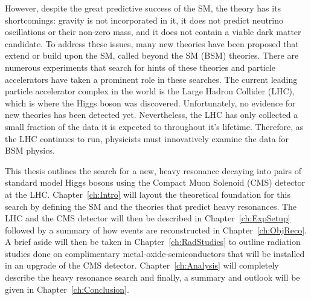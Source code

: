 However, despite the great predictive success of the SM, the theory has its shortcomings: gravity is not incorporated in it, it does not predict neutrino oscillations or their non-zero mass, and it does not contain a viable dark matter candidate. To address these issues, many new theories have been proposed that extend or build upon the SM, called beyond the SM (BSM) theories. There are numerous experiments that search for hints of these theories and particle accelerators have taken a prominent role in these searches. The current leading particle accelerator complex in the world is the Large Hadron Collider (LHC), which is where the Higgs boson was discovered. Unfortunately, no evidence for new theories has been detected yet. Nevertheless, the LHC has only collected a small fraction of the data it is expected to throughout it’s lifetime. Therefore, as the LHC continues to run, physicists must innovatively examine the data for BSM physics.

This thesis outlines the search for a new, heavy resonance decaying into pairs of standard model Higgs bosons using the Compact Muon Solenoid (CMS) detector at the LHC. Chapter~\ref{ch:Intro} will layout the theoretical foundation for this search by defining the SM and the theories that predict heavy resonances. The LHC and the CMS detector will then be described in Chapter~\ref{ch:ExpSetup} followed by a summary of how events are reconstructed in Chapter~\ref{ch:ObjReco}. A brief aside will then be taken in Chapter~\ref{ch:RadStudies} to outline radiation studies done on complimentary metal-oxide-semiconductors that will be installed in an upgrade of the CMS detector. Chapter~\ref{ch:Analysis} will completely describe the heavy resonance search and finally, a summary and outlook will be given in Chapter~\ref{ch:Conclusion}.
